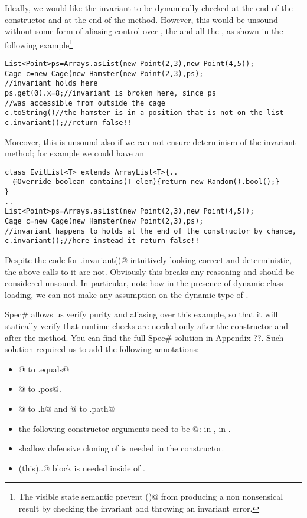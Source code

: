 Ideally, we would like the invariant to be dynamically checked 
at the end of the constructor and at the end of the \Q@move@ method.
However, this would be unsound without some form of aliasing control over \Q@Hamster@,
the \Q@List@ and all the \Q@Point@s, as shown in the following example\footnote{
The visible state semantic prevent \Q@toString()@ from producing a non nonsensical result
by checking the invariant and throwing an invariant error.
}
\begin{lstlisting}
List<Point>ps=Arrays.asList(new Point(2,3),new Point(4,5));
Cage c=new Cage(new Hamster(new Point(2,3),ps);
//invariant holds here
ps.get(0).x=8;//invariant is broken here, since ps
//was accessible from outside the cage
c.toString()//the hamster is in a position that is not on the list
c.invariant();//return false!!
\end{lstlisting}

Moreover, this is unsound also if we can not ensure determinism of the invariant method;
for example we could have an \Q@EvilList@

\begin{lstlisting}
class EvilList<T> extends ArrayList<T>{..
  @Override boolean contains(T elem){return new Random().bool();}
}
..
List<Point>ps=Arrays.asList(new Point(2,3),new Point(4,5));
Cage c=new Cage(new Hamster(new Point(2,3),ps);
//invariant happens to holds at the end of the constructor by chance,
c.invariant();//here instead it return false!!
\end{lstlisting}

Despite the code for \Q@Cage.invariant()@ intuitively looking correct and deterministic, the above calls to it are not. Obviously this breaks any reasoning and should be considered unsound. 
In particular, note how in the presence of dynamic class loading, 
we can not make any assumption on the dynamic type of \Q@path@.

Spec\# allows us verify purity and aliasing over this example, so that
it will statically verify that runtime checks are needed only
after the constructor and after the \Q@move@ method.
You can find the
full Spec\# solution in Appendix ??. Such solution required us to add
the following annotations:
\begin{itemize}
\item {}@ to \Q@Point.equals@
\item \Q@[Peer]@ to \Q@Hamster.pos@.
\item \Q@[Rep]@ to \Q@Cage.h@ and @ to \Q@Cage.path@
\item the following constructor arguments need to be \Q@[Captured]@:
\Q@Point@ in \Q@Hamster@, \Q@Hamster@ in \Q@Cage@.
\item shallow defensive cloning of \Q@path@ is needed in the \Q@Cage@ constructor.
\item\Q@expose(this){..}@ block is needed inside of \Q@move@.
\end{itemize}

